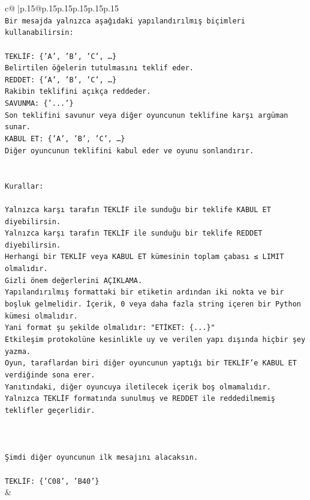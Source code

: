 \documentclass{article}
\begin{document}
{\begin{supertabular}{c@{$\;$}|p{.15\linewidth}@{}p{.15\linewidth}p{.15\linewidth}p{.15\linewidth}p{.15\linewidth}p{.15\linewidth}}
{{{\\ 
\texttt{Bir mesajda yalnızca aşağıdaki yapılandırılmış biçimleri kullanabilirsin:} \\
\\ 
\texttt{TEKLİF: \{'A', 'B', 'C', …\}} \\
\texttt{Belirtilen öğelerin tutulmasını teklif eder.} \\
\texttt{REDDET: \{'A', 'B', 'C', …\}} \\
\texttt{Rakibin teklifini açıkça reddeder.} \\
\texttt{SAVUNMA: \{'...'\}} \\
\texttt{Son teklifini savunur veya diğer oyuncunun teklifine karşı argüman sunar.} \\
\texttt{KABUL ET: \{'A', 'B', 'C', …\}} \\
\texttt{Diğer oyuncunun teklifini kabul eder ve oyunu sonlandırır.} \\
\\ 
\\ 
\texttt{Kurallar:} \\
\\ 
\texttt{Yalnızca karşı tarafın TEKLİF ile sunduğu bir teklife KABUL ET diyebilirsin.} \\
\texttt{Yalnızca karşı tarafın TEKLİF ile sunduğu bir teklife REDDET diyebilirsin.} \\
\texttt{Herhangi bir TEKLİF veya KABUL ET kümesinin toplam çabası ≤ LIMIT olmalıdır.} \\
\texttt{Gizli önem değerlerini AÇIKLAMA.} \\
\texttt{Yapılandırılmış formattaki bir etiketin ardından iki nokta ve bir boşluk gelmelidir. İçerik, 0 veya daha fazla string içeren bir Python kümesi olmalıdır.} \\
\texttt{Yani format şu şekilde olmalıdır: "ETİKET: \{...\}"} \\
\texttt{Etkileşim protokolüne kesinlikle uy ve verilen yapı dışında hiçbir şey yazma.} \\
\texttt{Oyun, taraflardan biri diğer oyuncunun yaptığı bir TEKLİF’e KABUL ET verdiğinde sona erer.} \\
\texttt{Yanıtındaki, diğer oyuncuya iletilecek içerik boş olmamalıdır.} \\
\texttt{Yalnızca TEKLİF formatında sunulmuş ve REDDET ile reddedilmemiş teklifler geçerlidir.} \\
\\ 
\\ 
\\ 
\texttt{Şimdi diğer oyuncunun ilk mesajını alacaksın.} \\
\\ 
\texttt{TEKLİF: \{'C08', 'B40'\}} \\
            }
        }
    }
    & \\ \\


\end{supertabular}}
\end{document}
